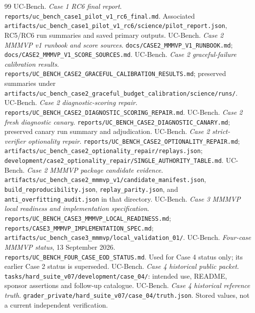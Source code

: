 \documentclass[11pt,a4paper]{article}
\newcommand{\filepath}[1]{\nolinkurl{#1}}
\begin{document}
\begin{thebibliography}{99}\small
{} UC-Bench. \emph{Case 1 RC6 final report}. \filepath{reports/uc_bench_case1_pilot_v1_rc6_final.md}. Associated \filepath{artifacts/uc_bench_case1_pilot_v1_rc6/science/pilot_report.json}, RC5/RC6 run summaries and saved primary outputs.
 UC-Bench. \emph{Case 2 MMMVP v1 runbook and score sources}. \filepath{docs/CASE2_MMMVP_V1_RUNBOOK.md}; \filepath{docs/CASE2_MMMVP_V1_SCORE_SOURCES.md}.
 UC-Bench. \emph{Case 2 graceful-failure calibration results}. \filepath{reports/UC_BENCH_CASE2_GRACEFUL_CALIBRATION_RESULTS.md}; preserved summaries under \filepath{artifacts/uc_bench_case2_graceful_budget_calibration/science/runs/}.
 UC-Bench. \emph{Case 2 diagnostic-scoring repair}. \filepath{reports/UC_BENCH_CASE2_DIAGNOSTIC_SCORING_REPAIR.md}.
 UC-Bench. \emph{Case 2 fresh diagnostic canary}. \filepath{reports/UC_BENCH_CASE2_DIAGNOSTIC_CANARY.md}; preserved canary run summary and adjudication.
 UC-Bench. \emph{Case 2 strict-verifier optionality repair}. \filepath{reports/UC_BENCH_CASE2_OPTIONALITY_REPAIR.md}; \filepath{artifacts/uc_bench_case2_optionality_repair/replays.json}; \filepath{development/case2_optionality_repair/SINGLE_AUTHORITY_TABLE.md}.
 UC-Bench. \emph{Case 2 MMMVP package candidate evidence}. \filepath{artifacts/uc_bench_case2_mmmvp_v1/candidate_manifest.json}, \filepath{build_reproducibility.json}, \filepath{replay_parity.json}, and \filepath{anti_overfitting_audit.json} in that directory.
 UC-Bench. \emph{Case 3 MMMVP local readiness and implementation specification}. \filepath{reports/UC_BENCH_CASE3_MMMVP_LOCAL_READINESS.md}; \filepath{reports/CASE3_MMMVP_IMPLEMENTATION_SPEC.md}; \filepath{artifacts/uc_bench_case3_mmmvp/local_validation_01/}.
 UC-Bench. \emph{Four-case MMMVP status}, 13 September 2026. \filepath{reports/UC_BENCH_FOUR_CASE_EOD_STATUS.md}. Used for Case 4 status only; its earlier Case 2 status is superseded.
 UC-Bench. \emph{Case 4 historical public packet}. \filepath{tasks/hard_suite_v07/development/case_04/}: intended use, README, sponsor assertions and follow-up catalogue.
 UC-Bench. \emph{Case 4 historical reference truth}. \filepath{grader_private/hard_suite_v07/case_04/truth.json}. Stored values, not a current independent verification.
\end{thebibliography}
\end{document}
